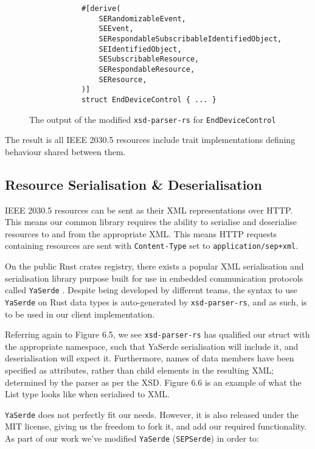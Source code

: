 \begin{figure}[H]
    \begin{center}
        \begin{lstlisting}
            #[derive(
                SERandomizableEvent,
                SEEvent,
                SERespondableSubscribableIdentifiedObject,
                SEIdentifiedObject,
                SESubscribableResource,
                SERespondableResource,
                SEResource,
            )]
            struct EndDeviceControl { ... }
        \end{lstlisting}
        \label{fig:edctraits}
        \caption{The output of the modified \texttt{xsd-parser-rs} for \texttt{EndDeviceControl}}
    \end{center}
\end{figure}

The result is all IEEE 2030.5 resources include trait implementations defining behaviour shared between them. 



\subsection{Resource Serialisation \& Deserialisation}
IEEE 2030.5 resources can be sent as their XML representations over HTTP. This means our common library requires the ability to serialise and deserialise resources to and from the appropriate XML.
This means HTTP requests containing resources are sent with \texttt{Content-Type} set to \texttt{application/sep+xml}.

On the public Rust crates registry, there exists a popular XML serialisation and serialisation library purpose built for use in embedded communication protocols called \texttt{YaSerde} \cite[]{YaSerde}.
Despite being developed by different teams, the syntax to use \texttt{YaSerde} on Rust data types is auto-generated by \texttt{xsd-parser-rs}, and as such, is to be used in our client implementation.

Referring again to Figure 6.5, we see \texttt{xsd-parser-rs} has qualified our struct with the appropriate namespace, such that YaSerde serialisation will include it, and deserialisation will expect it.
Furthermore, names of data members have been specified as attributes, rather than child elements in the resulting XML; determined by the parser as per the XSD.
Figure 6.6 is an example of what the List type looks like when serialised to XML.

\texttt{YaSerde} does not perfectly fit our needs. However, it is also released under the MIT license, giving us the freedom to fork it, and add our required functionality.
As part of our work we've modified \texttt{YaSerde} (\texttt{SEPSerde}) in order to:

